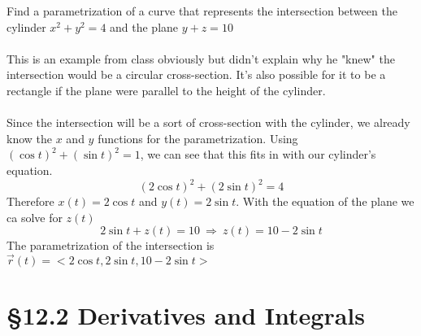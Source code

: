 \documentclass[12 pt]{article}
\begin{document}
		\begin{exmp*}
			Find a parametrization of a curve that represents the intersection between the cylinder $x^2+y^2=4$ and the plane $y+z=10$\\\\
			This is an example from class obviously but didn't explain why he "knew" the intersection would be a circular cross-section. It's also possible for it to be a rectangle if the plane were parallel to the height of the cylinder.\\\\
			Since the intersection will be a sort of cross-section with the cylinder, we already know the $x$ and $y$ functions for the parametrization. Using $(\cos{t})^2+(\sin{t})^2=1$, we can see that this fits in with our cylinder's equation.
			$$(2\cos{t})^2+(2\sin{t})^2=4$$
			Therefore $x(t)=2\cos{t}$ and $y(t)=2\sin{t}$. With the equation of the plane we ca solve for $z(t)$
			$$2\sin{t}+z(t)=10\ \Rightarrow \ z(t)=10-2\sin{t}$$
			The parametrization of the intersection is $\vec{r}(t)=<2\cos{t},2\sin{t},10-2\sin{t}>$
		\end{exmp*}
	\section{\S 12.2 Derivatives and Integrals}
\end{document}
